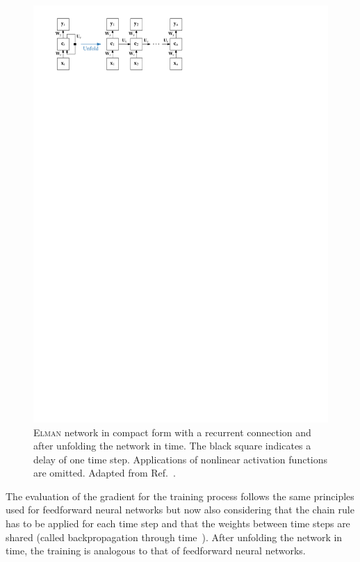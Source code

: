 \begin{figure}[htb]
  \centering
  \includegraphics{./figures/theory/elman_rnn.pdf}
  \caption[\textsc{Elman} network]{\textsc{Elman} network in compact form with
    a recurrent connection and after unfolding the network in time. The black
    square indicates a delay of one time step. Applications of nonlinear
    activation functions are omitted. Adapted from
    Ref.~\cite{lecun_bengio_hinton_DL}.}
  \label{fig:schematic_elman_rnn}
\end{figure}

The evaluation of the gradient for the training process follows the same
principles used for feedforward neural networks but now also considering that
the chain rule has to be applied for each time step and that the weights between
time steps are shared (called backpropagation through
time~\cite{williams_zipser}). After unfolding the network in time, the training
is analogous to that of feedforward neural networks.

